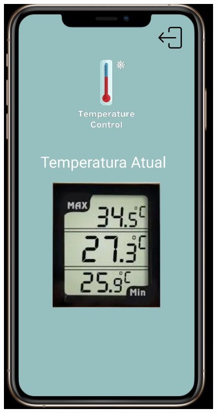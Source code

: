 \begin{figure}
\begin{minipage}{0.5\textwidth}
            \includegraphics[height=0.4\textheight]{img/mobile/temp_atual.jpeg}
            \label{fig:mobileTempAtual}
        \end{minipage}
    \end{figure}

